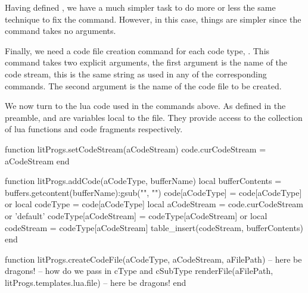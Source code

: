 Having defined \type{\fixStartLitProgs}, we have a much simpler task to do 
more or less the same technique to fix the \type{\stopXXX} command. 
However, in this case, things are simpler since the \type{\stopXXX} 
command takes no arguments. 

\startMkIVCode
\def\fixStopLitProgs#1{%
  \letvalue{oldStop#1}=\getvalue{stop#1}%
  \setvalue{stop#1}{%
    \getvalue{oldStop#1}%
    \directlua{
      thirddata.literateProgs.addCode(
        '#1',
        '_typing_'
      )
    }
  }
}
\stopMkIVCode




Finally, we need a code file creation command for each code type, 
\type{\createXXXFile}. This command takes two explicit arguments, the 
first argument is the name of the code stream, this is the same string as 
used in any of the corresponding \type{\startXXX} commands. The second 
argument is the name of the code file to be created. 

\startMkIVCode
\def\defineLitProgsCreateFile#1{%
  \setvalue{create#1File}#2#3{%
    \directlua{
      thirddata.literateProgs.createCodeFile(
        '#1',
        '#2',
        '#3'
      )
    }
  }
}
\stopMkIVCode

We now turn to the lua code used in the \type{\directlua} commands above. 
As defined in the preamble,  and  are variables 
local to the  file. They provide access to the 
collection of lua functions and code fragments respectively. 

\startLuaCode
function litProgs.setCodeStream(aCodeStream)
  code.curCodeStream = aCodeStream  
end

function litProgs.addCode(aCodeType, bufferName)
  local bufferContents  =
    buffers.getcontent(bufferName):gsub("", "\n")
  code[aCodeType]       = code[aCodeType] or { }
  local codeType        = code[aCodeType]
  local aCodeStream     = code.curCodeStream or 'default'
  codeType[aCodeStream] = codeType[aCodeStream] or { }
  local codeStream      = codeType[aCodeStream]
  table_insert(codeStream, bufferContents)
end

function litProgs.createCodeFile(aCodeType,
                                 aCodeStream,
                                 aFilePath)
  -- here be dragons! -- how do we pass in cType and cSubType
  renderFile(aFilePath, litProgs.templates.lua.file)
  -- here be dragons!
end
\stopLuaCode

\stopchapter